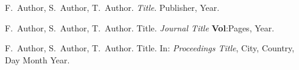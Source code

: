 \documentclass[]{YIC2015}
\begin{document}
\begin{thebibliography}{99}

F.~Author, S.~Author, T.~Author. \textit{Title}. Publisher, Year.

F.~Author, S.~Author, T.~Author. Title. \textit{Journal Title} %
\textbf{Vol}:Pages, Year.

F.~Author, S.~Author, T.~Author. Title. In: \textit{Proceedings Title}, City, Country, Day Month Year.


\end{thebibliography}

\end{document}
